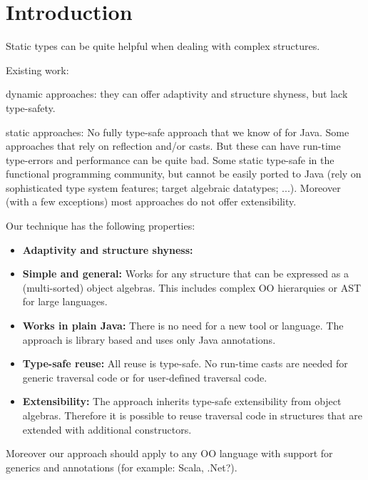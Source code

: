 \section{Introduction}

Static types can be quite helpful when dealing with complex structures.

Existing work: 

dynamic approaches: they can offer adaptivity and 
structure shyness, but lack type-safety.

static approaches: No fully type-safe approach that we know 
of for Java. Some approaches that rely on reflection and/or casts.
But these can have run-time type-errors and performance can be 
quite bad. 
Some static type-safe in the functional programming community, 
but cannot be easily ported to Java (rely on sophisticated type 
system features; target algebraic datatypes; ...). Moreover 
(with a few exceptions) most approaches do not offer extensibility. 


Our technique has the following properties:

\begin{itemize}

\item {\bf Adaptivity and structure shyness:}

\item {\bf Simple and general:} Works for any structure that can be expressed 
as a (multi-sorted) object algebras. This includes complex OO hierarquies
or AST for large languages. 

\item {\bf Works in plain Java:} There is no need for a new tool or language. 
The approach is library based and uses only Java annotations. 

\item {\bf Type-safe reuse:}   All reuse is type-safe. No run-time
  casts are needed for generic traversal code or for user-defined 
  traversal code. 

\item {\bf Extensibility:} The approach inherits type-safe
  extensibility from object algebras. Therefore it is possible to
  reuse traversal code in structures that are extended with additional
  constructors.

\end{itemize}

Moreover our approach should apply to any OO language with support 
for generics and annotations (for example: Scala, .Net?).

